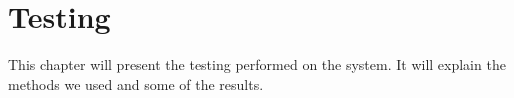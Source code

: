 \chapter{Testing}
This chapter will present the testing performed on the system. It will explain the methods we used and some of the results.


